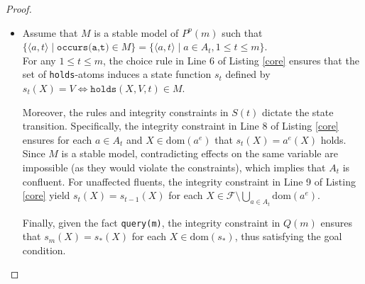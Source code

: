 \documentclass[
     11pt,                    %
     a4paper,             %
     BCOR=10mm,     %
     DIV=14,                 %
     listof=totoc,                    %
     bibliography=totoc,       %
     index=totoc,              %
     parskip            %
     twoside,
     headsepline
     ]{scrreprt}
\theoremstyle{definition}
\theoremstyle{definition}
\theoremstyle{remark}
\theoremstyle{bfnote}
\newcommand{\dom}{\mathrm{dom}}
\begin{document}
\begin{proof}
\begin{itemize}
      Thus, the stable model $M$ of $P^R(m)$ corresponds to
      \begin{align*}
        M = I &\cup \{\texttt{occurs(a,t)} \mid a \in A_t, 1 \le t \le m \} \\
          &\cup \{\texttt{holds(X,V,t)} \mid X \in \mathcal F, V=s_t(X), 0 \le t \le m \} \\
          &\cup \{\texttt{reach(X,V,t)} \mid X \in \mathcal F, V \in \{s_{t-1}, s_t\}, 1 \le t \le m\} \\
          &\cup \{\texttt{apply(a,t)} \mid a \in \mathcal O: a^c(X) \in \{s_{t-1}(X), s_t(X)\} \text{ for each } X \in \dom(a^c)\} \\
          &\cup \{\texttt{ready(a,t)} \mid a \in \mathcal O, 1 \le t \le m\} \\
          &\cup \{\texttt{query(m)}\}.
      \end{align*}
      Since $M$ contains \texttt{ready(a,t)} for all actions $a \in \mathcal O$, the integrity constraint in Line 7 of Listing \ref{relaxed_exists} is satisfied. Furthermore, all state transition constraints are met by the definition of $s_t$.
      Therefore, $M$ is a stable model of $P^R(m)$.
    \item[($\Leftarrow$):]
      Assume that $M$ is a stable model of $P^p(m)$ such that $\{\langle a, t \rangle \mid \texttt{occurs(a,t)} \in M \} = \{\langle a, t \rangle \mid a \in A_t, 1 \le t \le m \}$. \\
      For any $1 \le t \le m$, the choice rule in Line 6 of Listing \ref{core} ensures that the set of \texttt{holds}-atoms induces a state function $s_t$ defined by $s_t(X) = V \Leftrightarrow \texttt{holds}(X,V,t) \in M$.
      
      Moreover, the rules and integrity constraints in $S(t)$ dictate the state transition. Specifically, the integrity constraint in Line 8 of Listing \ref{core} ensures for each $a \in A_t$ and $X \in \dom(a^e)$ that $s_t(X) = a^e(X)$ holds. Since $M$ is a stable model, contradicting effects on the same variable are impossible (as they would violate the constraints), which implies that $A_t$ is confluent.
      For unaffected fluents, the integrity constraint in Line 9 of Listing \ref{core} yield $s_t(X) = s_{t-1}(X)$ for each $X \in \mathcal F \setminus \bigcup_{a \in A_t} \dom(a^e)$. 
      
      Finally, given the fact \texttt{query(m)}, the integrity constraint in $Q(m)$ ensures that \mbox{$s_m(X) = s_*(X)$} for each $X \in \dom(s_*)$, thus satisfying the goal condition.
      

\end{itemize}
\end{proof}
\end{document}
